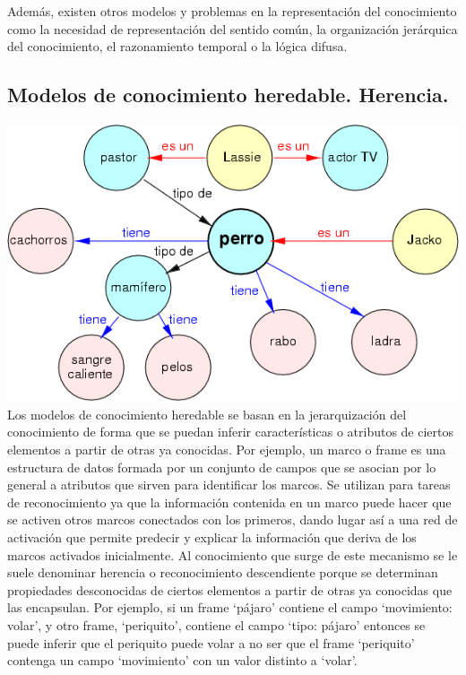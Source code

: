 \documentclass[a4paper, 11pt]{article}
\begin{document}
Además, existen otros modelos y problemas en la representación del conocimiento como la necesidad de representación del sentido común, la organización jerárquica del conocimiento, el razonamiento temporal o la lógica difusa.
 
\subsection{Modelos de conocimiento heredable. Herencia.}
\includegraphics[width=\textwidth]{racimo.png} 
Los modelos de conocimiento heredable se basan en la jerarquización del conocimiento de forma que se puedan inferir características o atributos de ciertos elementos a partir de otras ya conocidas. Por ejemplo, un marco o frame es una estructura de datos formada por un conjunto de campos que se asocian por lo general a atributos que sirven para identificar los marcos. Se utilizan para tareas de reconocimiento ya que la información contenida en un marco puede hacer que se activen otros marcos conectados con los primeros, dando lugar así a una red de activación que permite predecir y explicar la información que deriva de los marcos activados inicialmente. Al conocimiento que surge de este mecanismo se le suele denominar herencia o reconocimiento descendiente porque se determinan propiedades desconocidas de ciertos elementos a partir de otras ya conocidas que las encapsulan. Por ejemplo, si un frame `pájaro' contiene el campo `movimiento: volar', y otro frame, `periquito', contiene el campo `tipo: pájaro' entonces se puede inferir que el periquito puede volar a no ser que el frame `periquito' contenga un campo `movimiento' con un valor distinto a `volar'.
\end{document}
